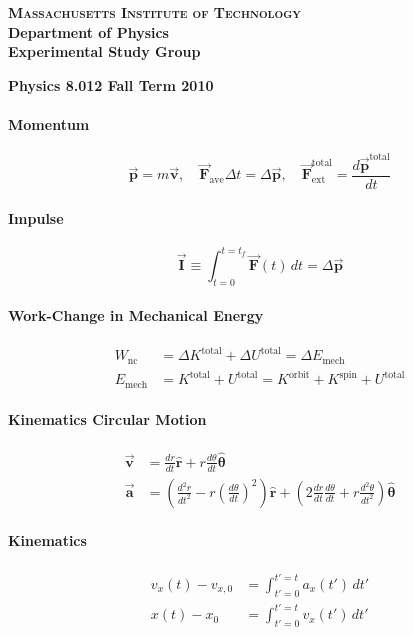 \documentclass{article}
\let\oldvec=\vec
\let\oldhat=\hat
\renewcommand{\vec}[1]{\oldvec{\boldsymbol{#1}}}
\renewcommand{\hat}[1]{\oldhat{\boldsymbol{#1}}}
\newcommand{\uvec}[1]{\hat{#1}}
\begin{document}
{\large
\begin{center}
\textbf{\textsc{Massachusetts Institute of Technology}} \\
 \textbf{Department of Physics} \\
 \textbf{Experimental Study Group}
\end{center}
\noindent \textbf{Physics 8.012 \hfill Fall Term 2010}} \par


\begin{multicols}{2}
  \paragraph{Momentum}
    $$\vec p = m \vec v,\quad \vec F_\text{ave} \Delta t = \Delta \vec p,\quad \vec F_\text{ext}^\text{total} = \frac{d\vec p^\text{total}}{dt}$$
    
  \paragraph{Impulse}
    $$\vec I \equiv \int_{t=0}^{t=t_f} \vec F(t)\,dt = \Delta \vec p$$
    
  \paragraph{Work-Change in Mechanical Energy}
    \begin{align*}
      W_\text{nc} & = \Delta K^\text{total} + \Delta U^\text{total} = \Delta E_\text{mech} \\
      E_\text{mech} & = K^\text{total} + U^\text{total} = K^\text{orbit} + K^\text{spin} + U^\text{total}
    \end{align*}
  
  \paragraph{Kinematics Circular Motion}
    \begin{align*}
      \vec v & = \frac{dr}{dt}\uvec r + r\frac{d\theta}{dt} \uvec\theta \\
      \vec a & = \left(\frac{d^2r}{dt^2} - r\left(\frac{d\theta}{dt}\right)^2\right)\uvec r + \left(2\frac{dr}{dt}\frac{d\theta}{dt} + r \frac{d^2\theta}{dt^2}\right)\uvec \theta
    \end{align*}
  
  \paragraph{Kinematics}
    \begin{align*}
      v_x(t) - v_{x,0} & = \int_{t'=0}^{t'=t} a_x(t')\,dt' \\
      x(t) - x_0 & = \int_{t'=0}^{t'=t} v_x(t')\,dt'
    \end{align*}
    

\end{multicols}
\end{document}
